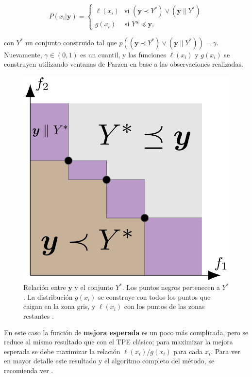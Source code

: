 \begin{equation}
\label{eq:motpe}
P(x_i|\textbf{y}) =
	\begin{cases}
		\ell (x_i) & \text{si } (\textbf{y} \prec Y^*) \vee (\textbf{y} \| Y^*) \\
		g(x_i) & \text{si } Y* \preceq \textbf{y},
	\end{cases}
\end{equation}

con $Y^*$ un conjunto construido tal que $p((\textbf{y} \prec Y^*) \vee (\textbf{y} \| Y^*)) = \gamma$. Nuevamente, $\gamma \in (0,1)$ es un cuantil, y las funciones $\ell(x_i)$ y $g(x_i)$ se construyen utilizando ventanas de Parzen en base a las observaciones realizadas.


\begin{figure}[h!]
\centering
\includegraphics[width=.45\columnwidth]{figs//tpemo.png}
\caption{Relación entre $\textbf{y}$ y el conjunto $ Y^*$. Los puntos negros pertenecen a  $Y^*$. La distribución $g(x_i)$ se construye con todos los puntos que caigan en la zona gris, y $\ell(x_i)$ con los puntos de las zonas restantes \cite{10.1613/jair.1.13188}.}
\label{fig:tpemo}
\end{figure}

En este caso la función de \textbf{mejora esperada} es un poco más complicada, pero se reduce al mismo resultado que con el TPE clásico; para maximizar la mejora esperada se debe maximizar la relación $\ell(x_i)/g(x_i)$ para cada $x_i$. Para ver en mayor detalle este resultado y el algoritmo completo del método, se recomienda ver \cite{10.1613/jair.1.13188}.





